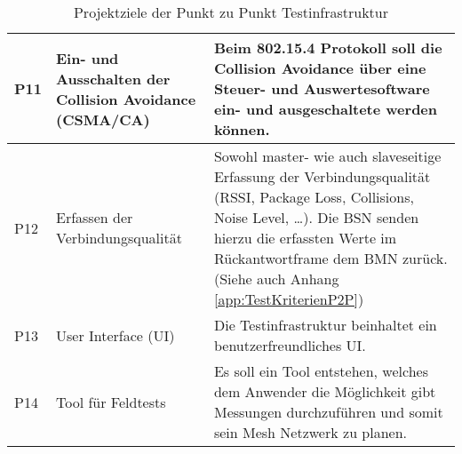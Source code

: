 \begin{table}[H]
\begin{tabular}{ | C{0.7cm} | p{3.7cm} | p{10.2cm} |}
		P11 & Ein- und Ausschalten der Collision Avoidance (CSMA/CA)& Beim 802.15.4 Protokoll soll die Collision Avoidance über eine Steuer- und Auswertesoftware ein- und ausgeschaltete werden können.\\ \hline
		
		P12 & Erfassen der Verbindungsqualität & Sowohl master- wie auch slaveseitige Erfassung der Verbindungsqualität (RSSI, Package Loss, Collisions, Noise Level, …). Die BSN senden hierzu die erfassten Werte im Rückantwortframe dem BMN zurück. (Siehe auch Anhang \ref{app:TestKriterienP2P})\\ \hline
		
		P13 & User Interface (UI) & Die Testinfrastruktur beinhaltet ein benutzerfreundliches UI.\\ \hline
		
		P14 & Tool für Feldtests & Es soll ein Tool entstehen, welches dem Anwender die Möglichkeit gibt Messungen durchzuführen und somit sein Mesh Netzwerk zu planen.\\ \hline

		
	\end{tabular}\\
	\caption{Projektziele der Punkt zu Punkt Testinfrastruktur}
	\label{tab:ProjektzielederPunktzuPunktTestinfrastruktur}
\end{table}


